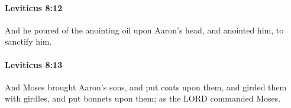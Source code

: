 		\paragraph{Leviticus 8:12} %
			\label{LEVITICUS-8-12}

			And he poured of the anointing oil upon Aaron’s head, and anointed him, to sanctify him.


		\paragraph{Leviticus 8:13} %
			\label{LEVITICUS-8-13}

			And Moses brought Aaron’s sons, and put coats upon them, and girded them with girdles, and put bonnets upon them; as the LORD commanded Moses.


